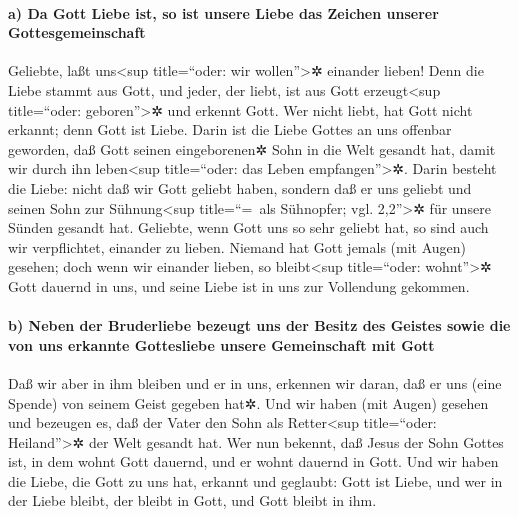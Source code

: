 \hypertarget{a-da-gott-liebe-ist-so-ist-unsere-liebe-das-zeichen-unserer-gottesgemeinschaft}{%
\paragraph{a) Da Gott Liebe ist, so ist unsere Liebe das Zeichen unserer
Gottesgemeinschaft}\label{a-da-gott-liebe-ist-so-ist-unsere-liebe-das-zeichen-unserer-gottesgemeinschaft}}

 Geliebte, laßt uns\textless sup title=``oder: wir
wollen''\textgreater✲ einander lieben! Denn die Liebe stammt aus Gott,
und jeder, der liebt, ist aus Gott erzeugt\textless sup title=``oder:
geboren''\textgreater✲ und erkennt Gott.  Wer nicht liebt,
hat Gott nicht erkannt; denn Gott ist Liebe.  Darin ist
die Liebe Gottes an uns offenbar geworden, daß Gott seinen eingeborenen✲
Sohn in die Welt gesandt hat, damit wir durch ihn leben\textless sup
title=``oder: das Leben empfangen''\textgreater✲.  Darin
besteht die Liebe: nicht daß wir Gott geliebt haben, sondern daß er uns
geliebt und seinen Sohn zur Sühnung\textless sup title=``=~als
Sühnopfer; vgl. 2,2''\textgreater✲ für unsere Sünden gesandt hat.
 Geliebte, wenn Gott uns so sehr geliebt hat, so sind
auch wir verpflichtet, einander zu lieben.  Niemand hat
Gott jemals (mit Augen) gesehen; doch wenn wir einander lieben, so
bleibt\textless sup title=``oder: wohnt''\textgreater✲ Gott dauernd in
uns, und seine Liebe ist in uns zur Vollendung gekommen.

\hypertarget{b-neben-der-bruderliebe-bezeugt-uns-der-besitz-des-geistes-sowie-die-von-uns-erkannte-gottesliebe-unsere-gemeinschaft-mit-gott}{%
\paragraph{b) Neben der Bruderliebe bezeugt uns der Besitz des Geistes
sowie die von uns erkannte Gottesliebe unsere Gemeinschaft mit
Gott}\label{b-neben-der-bruderliebe-bezeugt-uns-der-besitz-des-geistes-sowie-die-von-uns-erkannte-gottesliebe-unsere-gemeinschaft-mit-gott}}

 Daß wir aber in ihm bleiben und er in uns, erkennen wir
daran, daß er uns (eine Spende) von seinem Geist gegeben hat✲.
 Und wir haben (mit Augen) gesehen und bezeugen es, daß
der Vater den Sohn als Retter\textless sup title=``oder:
Heiland''\textgreater✲ der Welt gesandt hat.  Wer nun
bekennt, daß Jesus der Sohn Gottes ist, in dem wohnt Gott dauernd, und
er wohnt dauernd in Gott.  Und wir haben die Liebe, die
Gott zu uns hat, erkannt und geglaubt: Gott ist Liebe, und wer in der
Liebe bleibt, der bleibt in Gott, und Gott bleibt in ihm.

